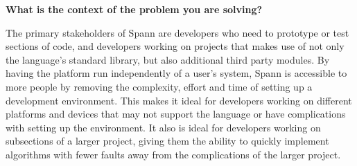 \documentclass{article}
\begin{document}
\large
\textbf{What is the context of the problem you are solving?}\\
\normalsize

The primary stakeholders of Spann are developers who need to prototype or test
sections of code, and developers working on projects that makes use of not only
the language's standard library, but also additional third party modules. By
having the platform run independently of a user’s system, Spann is accessible
to more people by removing the complexity, effort and time of setting up a
development environment. This makes it ideal for developers working on
different platforms and devices that may not support the language or have
complications with setting up the environment. It also is ideal for developers
working on subsections of a larger project, giving them the ability to quickly
implement algorithms with fewer faults away from the complications of the
larger project.\\
\end{document}
